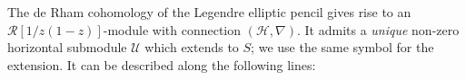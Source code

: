 
The de Rham cohomology of the Legendre elliptic pencil gives
rise to an $\mathcal{R}[1/z(1-z)]$-module with connection
$(\mathcal{H},\nabla)$.  It admits a \emph{unique} non-zero horizontal
submodule $\mathcal{U}$ which extends to $S$; we use the same
symbol for the extension. It can be described along the following lines:

